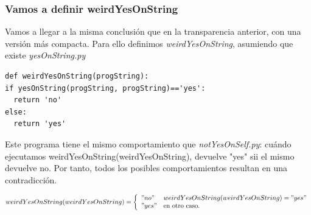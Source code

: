 \documentclass[xcolor=table]{beamer}
\begin{document}
\begin{frame}[fragile] \frametitle{Vamos a definir weirdYesOnString} \scriptsize  
Vamos a llegar a la misma conclusión que en la transparencia anterior, con una versión más compacta. Para ello definimos \textit{weirdYesOnString}, asumiendo que existe \textit{yesOnString.py}


 \begin{verbatim}
def weirdYesOnString(progString):
if yesOnString(progString, progString)=='yes':
  return 'no'
else:
  return 'yes'
\end{verbatim}    

Este programa tiene el mismo comportamiento que \textit{notYesOnSelf.py}: cuándo ejecutamos 
weirdYesOnString(weirdYesOnString), devuelve "yes" sii el mismo devuelve no. Por tanto, todos los posibles
comportamientos resultan en una contradicción.


\begin{dmath}
     \label{eq:weirdYesOnString}
     weirdYesOnString (weirdYesOnString) =  \left\{
	       \begin{array}{ll}
		 "no"      & weirdYesOnString (weirdYesOnString) = "yes" \\
		 "yes"     & \text{en otro caso.} \\
	       \end{array}
	     \right.
 \end{dmath}


\end{frame} 
\end{document}
